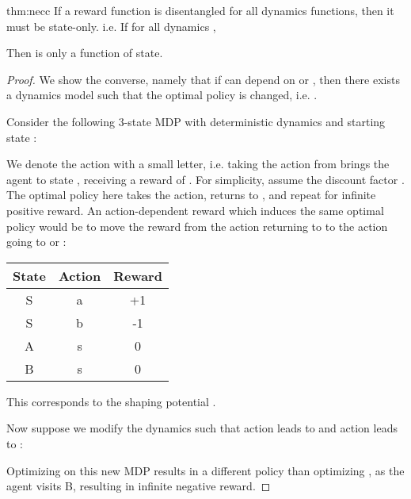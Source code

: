 \documentclass{article} \usepackage{iclr2018_conference,times}
\begin{document}
\begin{reptheorem}{thm:necc}
If a reward function  is disentangled for all dynamics functions, then it must be state-only. i.e. If for all dynamics ,

Then  is only a function of state.
\end{reptheorem}
\begin{proof}
We show the converse, namely that if  can depend on  or , then there exists a dynamics model  such that the optimal policy is changed, i.e. .

Consider the following 3-state MDP with deterministic dynamics and starting state :

\begin{figure}[h]
\centering
{}
\end{figure}

We denote the action with a small letter, i.e. taking the action  from  brings the agent to state , receiving a reward of . For simplicity, assume the discount factor . The optimal policy here takes the  action, returns to , and repeat for infinite positive reward. An action-dependent reward which induces the same optimal policy would be to move the reward from the action returning to  to the action going to  or :
\begin{center}

\begin{tabular}{ |c|c|c| } 
 \hline
 State & Action & Reward \\ 
 \hline 
 S & a & +1 \\ 
 S & b & -1 \\ 
 A & s & 0 \\ 
 B & s & 0 \\ 
 \hline
\end{tabular}
\end{center}

This corresponds to the shaping potential .

Now suppose we modify the dynamics such that action  leads to  and action  leads to :

\begin{figure}[h]
\centering
{}
\end{figure}

Optimizing  on this new MDP results in a different policy than optimizing , as the agent visits B, resulting in infinite negative reward.
\end{proof}
\end{document}
